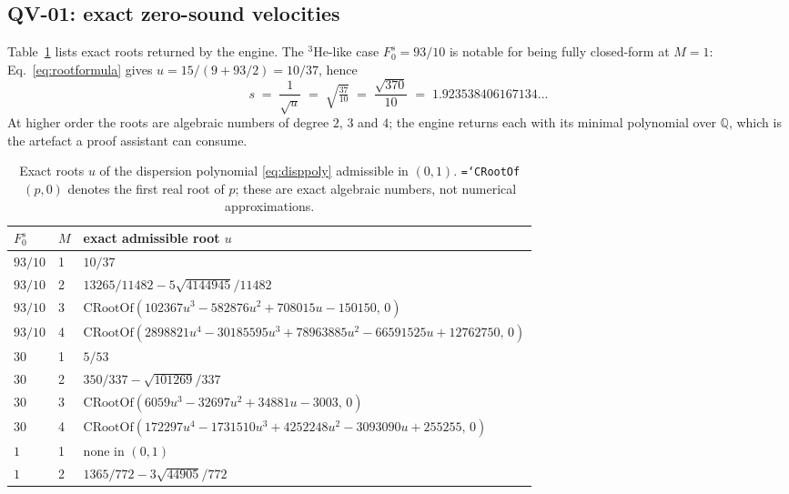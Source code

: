 \documentclass[11pt,a4paper]{article}
\newcommand{\Fzs}{F_0^{s}}
\newcommand{\code}[1]{\texttt{\hyphenchar\font=`\-\relax #1}}
\begin{document}
\subsection{QV-01: exact zero-sound velocities}

Table~\ref{tab:exact} lists exact roots returned by the engine. The
$^3$He-like case $\Fzs = 93/10$ is notable for being fully closed-form at
$M=1$: Eq.~\eqref{eq:rootformula} gives $u = 15/(9+93/2) = 10/37$, hence
\begin{equation}
  s \;=\; \frac{1}{\sqrt{u}} \;=\; \sqrt{\tfrac{37}{10}} \;=\; \frac{\sqrt{370}}{10}
  \;=\; 1.923538406167134\ldots
\end{equation}
At higher order the roots are algebraic numbers of degree $2$, $3$ and $4$; the
engine returns each with its minimal polynomial over $\mathbb{Q}$, which is the
artefact a proof assistant can consume.

\begin{table}[htbp]
\centering
\caption{Exact roots $u$ of the dispersion polynomial \eqref{eq:disppoly}
admissible in $(0,1)$. \code{CRootOf}$(p,0)$ denotes the first real root of $p$;
these are exact algebraic numbers, not numerical approximations.}
\label{tab:exact}
\small
\begin{tabular}{ll>{\raggedright\arraybackslash}p{9.3cm}}
\toprule
$\Fzs$ & $M$ & exact admissible root $u$ \\
\midrule
$93/10$ & 1 & $10/37$ \\
$93/10$ & 2 & $13265/11482 - 5\sqrt{4144945}/11482$ \\
$93/10$ & 3 & $\mathrm{CRootOf}(102367u^{3} - 582876u^{2} + 708015u - 150150,\,0)$ \\
$93/10$ & 4 & $\mathrm{CRootOf}(2898821u^{4} - 30185595u^{3} + 78963885u^{2} - 66591525u + 12762750,\,0)$ \\
\midrule
$30$ & 1 & $5/53$ \\
$30$ & 2 & $350/337 - \sqrt{101269}/337$ \\
$30$ & 3 & $\mathrm{CRootOf}(6059u^{3} - 32697u^{2} + 34881u - 3003,\,0)$ \\
$30$ & 4 & $\mathrm{CRootOf}(172297u^{4} - 1731510u^{3} + 4252248u^{2} - 3093090u + 255255,\,0)$ \\
\midrule
$1$ & 1 & none in $(0,1)$ \\
$1$ & 2 & $1365/772 - 3\sqrt{44905}/772$ \\
\bottomrule
\end{tabular}
\end{table}
\end{document}
